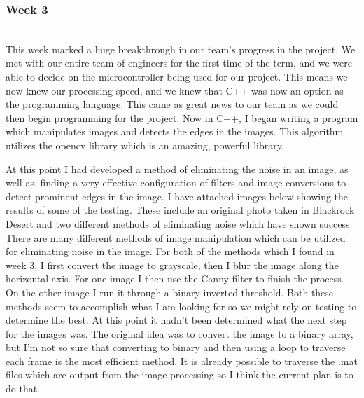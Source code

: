 \documentclass[10pt,letterpaper,onecolumn,draftclsnofoot,journal]{IEEEtran}
\begin{document}
\subsubsection{Week 3}\hspace*{\fill}\\
This week marked a huge breakthrough in our team's progress in the project. We met with our entire team of engineers for the first time of the term, and we were able to decide on the microcontroller being used for our project. This means we now knew our processing speed, and we knew that C++ was now an option as the programming language. This came as great news to our team as we could then begin programming for the project. Now in C++, I began writing a program which manipulates images and detects the edges in the images. This algorithm utilizes the opencv library which is an amazing, powerful library.\vspace{.3cm}
\par 
At this point I had developed a method of eliminating the noise in an image, as well as, finding a very effective configuration of filters and image conversions to detect prominent edges in the image. I have attached images below showing the results of some of the testing. These include an original photo taken in Blackrock Desert and two different methods of eliminating noise which have shown success. There are many different methods of image manipulation which can be utilized for eliminating noise in the image. For both of the methods which I found in week 3, I first convert the image to grayscale, then I blur the image along the horizontal axis. For one image I then use the Canny filter to finish the process. On the other image I run it through a binary inverted threshold. Both these methods seem to accomplish what I am looking for so we might rely on testing to determine the best. At this point it hadn't been determined what the next step for the images was. The original idea was to convert the image to a binary array, but I'm not so sure that converting to binary and then using a loop to traverse each frame is the most efficient method. It is already possible to traverse the .mat files which are output from the image processing so I think the current plan is to do that.
\end{document}
